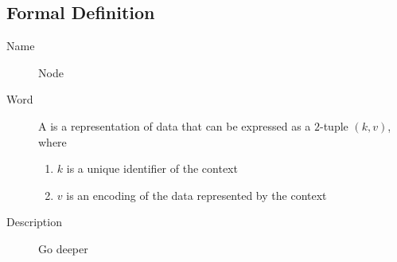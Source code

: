 
\subsection{Formal Definition}

\begin{description}
    \item[Name] Node \vspace{2mm}
    \item[Word] \begin{definition}[action]
              A \textbf{} is a representation of data that can be expressed as a $2$-tuple $(k,v)$, where
              \begin{enumerate}
                  \item $k$ is a unique identifier of the context
                  \item $v$ is an encoding of the data represented by the context
              \end{enumerate}
          \end{definition}
    \item[Description] Go deeper
\end{description}
